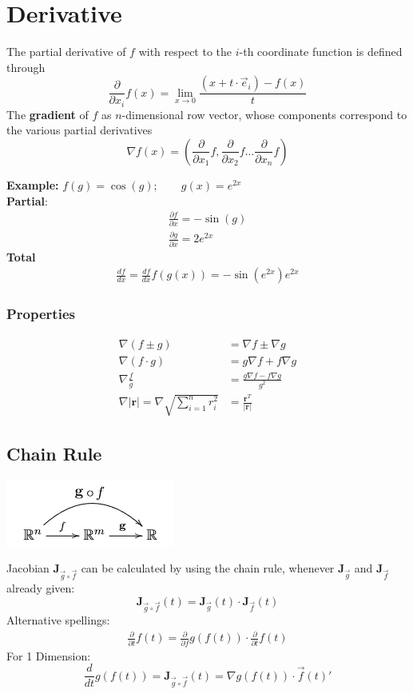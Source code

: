 \section{Derivative}
The partial derivative of $f$ with respect to the $i$-th coordinate function is defined through
\[
\frac{\partial}{\partial x_i}f(x) = \lim\limits_{x\rightarrow 0}\frac{(x + t\cdot \vec{e}_i) - f(x)}{t}
\]
The \textbf{gradient} of $f$ as $n$-dimensional row vector, whose components correspond to the various partial derivatives
\[
\nabla f(x) = \left(\frac{\partial}{\partial x_1}f, \frac{\partial}{\partial x_2}f \dots \frac{\partial}{\partial x_n}f\right)
\]

\noindent\textbf{Example:} $f(g) = \cos(g); \qquad g(x) = e^{2x}$ \\\indent \textbf{Partial}:
\begin{align*}
	\frac{\partial f}{\partial x} = -\sin(g) \\
	\frac{\partial g}{\partial x} = 2e^{2x}
\end{align*}
\indent \textbf{Total}
\begin{align*}
	\frac{df}{dx} = \frac{df}{dx}f(g(x)) = -\sin(e^{2x})e^{2x}
\end{align*}


\subsubsection{Properties}
\begin{align*}
	\nabla(f \pm g) &= \nabla f \pm \nabla g \\
	\nabla(f \cdot g) &= g\nabla f + f\nabla g \\
	\nabla\frac{f}{g} &= \frac{g\nabla f - f\nabla g}{g^2} \\
	\nabla\left|\mathbf{r}\right| = \nabla \sqrt{\sum_{i = 1}^{n}r^2_i}  &= \frac{\mathbf{r}^T}{\left|\mathbf{r}\right|}
\end{align*}



\subsection{Chain Rule}
\begin{center}
	\includegraphics[width=0.4\columnwidth]{Images/screenshot001}
\end{center}
Jacobian $\mathbf{J}_{\vec{g}\circ\vec{f}}$ can be calculated by using the chain rule, whenever $\mathbf{J}_{\vec{g}}$ and $\mathbf{J}_{\vec{f}}$ already given:
\[
\mathbf{J}_{\vec{g}\circ\vec{f}}(t) = \mathbf{J}_{\vec{g}}(t)\cdot\mathbf{J}_{\vec{f}}(t)
\]
Alternative spellings:
\begin{align*}
	\frac{\partial}{\partial t}f(t) = \frac{\partial}{\partial f}g(f(t)) \cdot \frac{\partial}{\partial t}f(t)
\end{align*}
For 1 Dimension:
\[
\frac{d}{dt}g(f(t)) = \mathbf{J}_{\vec{g}\circ\vec{f}}(t) = \nabla g(f(t)) \cdot \vec{f}(t)'
\]

